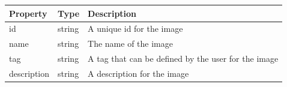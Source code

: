\documentclass[9pt,]{article}
\begin{document}
\begin{longtable}[]{@{}lll@{}}
\toprule
\begin{minipage}[b]{0.17\columnwidth}\raggedright
Property\strut
\end{minipage} & \begin{minipage}[b]{0.14\columnwidth}\raggedright
Type\strut
\end{minipage} & \begin{minipage}[b]{0.58\columnwidth}\raggedright
Description\strut
\end{minipage}\tabularnewline
\midrule
\endhead
\begin{minipage}[t]{0.17\columnwidth}\raggedright
id\strut
\end{minipage} & \begin{minipage}[t]{0.14\columnwidth}\raggedright
string\strut
\end{minipage} & \begin{minipage}[t]{0.58\columnwidth}\raggedright
A unique id for the image\strut
\end{minipage}\tabularnewline
\begin{minipage}[t]{0.17\columnwidth}\raggedright
name\strut
\end{minipage} & \begin{minipage}[t]{0.14\columnwidth}\raggedright
string\strut
\end{minipage} & \begin{minipage}[t]{0.58\columnwidth}\raggedright
The name of the image\strut
\end{minipage}\tabularnewline
\begin{minipage}[t]{0.17\columnwidth}\raggedright
tag\strut
\end{minipage} & \begin{minipage}[t]{0.14\columnwidth}\raggedright
string\strut
\end{minipage} & \begin{minipage}[t]{0.58\columnwidth}\raggedright
A tag that can be defined by the user for the image\strut
\end{minipage}\tabularnewline
\begin{minipage}[t]{0.17\columnwidth}\raggedright
description\strut
\end{minipage} & \begin{minipage}[t]{0.14\columnwidth}\raggedright
string\strut
\end{minipage} & \begin{minipage}[t]{0.58\columnwidth}\raggedright
A description for the image\strut
\end{minipage}\tabularnewline

\end{longtable}
\end{document}
